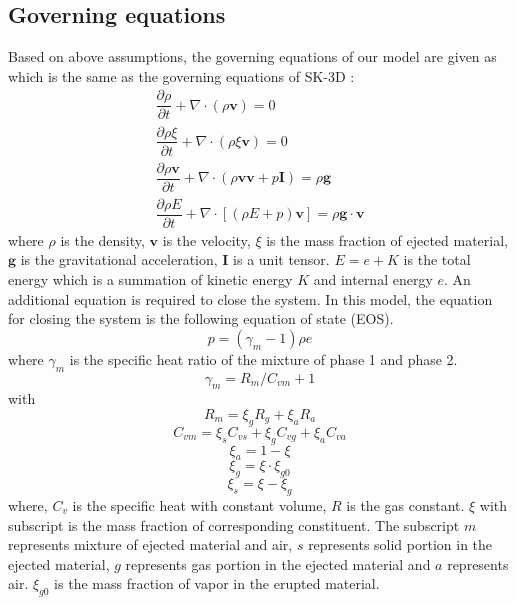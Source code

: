 \subsection{Governing equations}
Based on above assumptions, the governing equations of our model are given as which is the same as the governing equations of SK-3D \citep{suzuki2005numerical}:
\begin{align}
\dfrac{\partial \rho}{\partial t} + \nabla \cdot \left(\rho \textbf{v}\right) = 0 \label{eq:gov-cs-rho} \\
\dfrac{\partial \rho \xi}{\partial t} + \nabla \cdot \left(\rho \xi \textbf{v}\right) = 0 \label{eq:gov-cs-ks}\\
\dfrac{\partial \rho \textbf{v}}{\partial t} + \nabla \cdot \left(\rho \textbf{v} \textbf{v} + p\textbf{I}\right) = \rho \textbf{g} \label{eq:gov-cs-v} \\
\dfrac{\partial \rho E}{\partial t} + \nabla \cdot \left[\left(\rho E + p \right)\textbf{v}\right] = \rho \textbf{g} \cdot\textbf{v} \label{eq:gov-cs-e}
\end{align}
where $\rho$ is the density, $\textbf{v}$ is the velocity, $\xi$ is the mass fraction of ejected material, $\textbf{g}$ is the gravitational acceleration, $\textbf{I}$ is a unit tensor.
$E = e + K $ is the total energy which is a summation of kinetic energy $K$ and internal energy $e$.
An additional equation is required to close the system. In this model, the equation for closing the system is the following equation of state (EOS).
\begin{equation}
p = \left(\gamma_m - 1\right)\rho e \label{eq:EOS}
\end{equation}
where $\gamma_m$ is the specific heat ratio of the mixture of phase 1 and phase 2.
\begin{equation}
\gamma_m = R_m/C_{vm} + 1 \label{eq:gov-gm}
\end{equation}
with
\begin{equation}
R_m = \xi_g R_g + \xi_a R_a  \label{eq:gov-Rm}
\end{equation}
\begin{equation}
C_{vm} = \xi_s C_{vs} + \xi_g C_{vg} + \xi_a C_{va} \label{eq:gov-Cvm}
\end{equation}
\begin{equation}
\xi_a = 1 - \xi \label{eq:gov-na}
\end{equation}
\begin{equation}
\xi_g = \xi \cdot \xi_{g0} \label{eq:gov-ng}
\end{equation}
\begin{equation}
\xi_s = \xi - \xi_g \label{eq:gov-ns}
\end{equation}
where, $C_v$ is the specific heat with constant volume, $R$ is the gas constant. $\xi$ with subscript is the mass fraction of corresponding constituent. The subscript 
$m$ represents mixture of ejected material and air, $s$ represents solid portion in the ejected material, $g$ represents gas portion in the ejected material and $a$ represents air. $\xi_{g0}$ is the mass fraction of vapor in the erupted material.

